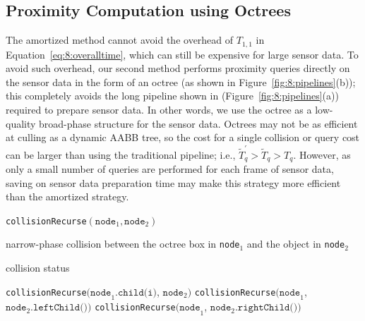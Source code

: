 \subsection{Proximity Computation using Octrees}
The amortized method cannot avoid the overhead of $T_{1,1}$ in Equation~\ref{eq:8:overalltime}, which can still be expensive for large sensor data.
To avoid such overhead, our second method
performs proximity queries directly on the sensor data in
the form of an octree (as shown in Figure~\ref{fig:8:pipelines}(b)); this completely avoids the long pipeline shown in (Figure~\ref{fig:8:pipelines}(a)) required to prepare sensor
data. In other words, we use the octree as a low-quality broad-phase
structure for the sensor data. Octrees may not be as efficient at
culling as a dynamic AABB tree, so the cost for a single collision or
query cost can be larger than using the traditional pipeline; i.e.,
$\widetilde{T}_q^\prime > \widetilde{T}_q > T_q$. However, as
only a small number of queries are performed for each frame of sensor
data, saving on sensor data preparation time may make this
strategy more efficient than the amortized strategy.




\begin{algorithm}[htb]
	\caption{\texttt{collisionRecurse}$(\texttt{node}_1, \texttt{node}_2)$}
	\label{algo:collision_recurse}
	\begin{algorithmic}[1]
                \STATE narrow-phase collision between the octree box in \texttt{node}$_1$ and the object in \texttt{node}$_2$
           \ENDIF

           \RETURN collision status
      \ENDIF

                   \STATE  \texttt{collisionRecurse}$\texttt{(node}_1.\texttt{child(i)}$, $\texttt{node}_2\texttt{)}$
                \ENDIF
              \ENDFOR
            \ELSE
              \STATE \texttt{collisionRecurse}$\texttt{(node}_1$, $\texttt{node}_2.\texttt{leftChild())}$
              \STATE \texttt{collisionRecurse}$\texttt{(node}_1$, $\texttt{node}_2.\texttt{rightChild())}$

            \ENDIF
\end{algorithmic}
\end{algorithm}



